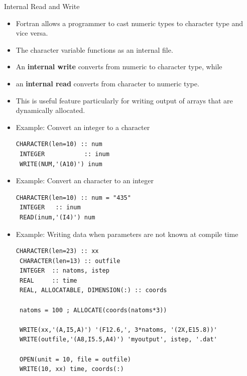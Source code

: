 \documentclass[c,mathserif,compress,xcolor=svgnames]{beamer}
\begin{document}
\begin{frame}{Internal Read and Write}
  \begin{itemize}
    \item Fortran allows a programmer to cast numeric types to character type and vice versa.
    \item The character variable functions as an internal file.
    \item An \textbf{internal write} converts from numeric to character type, while
    \item an \textbf{internal read} converts from character to numeric type.
    \item This is useful feature particularly for writing output of arrays that are dynamically allocated.
    \item Example: Convert an integer to a character
      \begin{lstlisting}[language={[90]Fortran}]
 CHARACTER(len=10) :: num
 INTEGER           :: inum
 WRITE(NUM,'(A10)') inum
      \end{lstlisting}
      \framebreak
    \item Example: Convert an character to an integer
      \begin{lstlisting}[language={[90]Fortran}]
 CHARACTER(len=10) :: num = "435"
 INTEGER   :: inum
 READ(inum,'(I4)') num
      \end{lstlisting}
    \item Example: Writing data when parameters are not known at compile time
      \begin{lstlisting}[language={[90]Fortran}]
 CHARACTER(len=23) :: xx
 CHARACTER(len=13) :: outfile
 INTEGER  :: natoms, istep
 REAL     :: time
 REAL, ALLOCATABLE, DIMENSION(:) :: coords

 natoms = 100 ; ALLOCATE(coords(natoms*3))

 WRITE(xx,'(A,I5,A)') '(F12.6,', 3*natoms, '(2X,E15.8))'
 WRITE(outfile,'(A8,I5.5,A4)') 'myoutput', istep, '.dat'

 OPEN(unit = 10, file = outfile)
 WRITE(10, xx) time, coords(:)
      \end{lstlisting}
  \end{itemize}
\end{frame}
\end{document}
